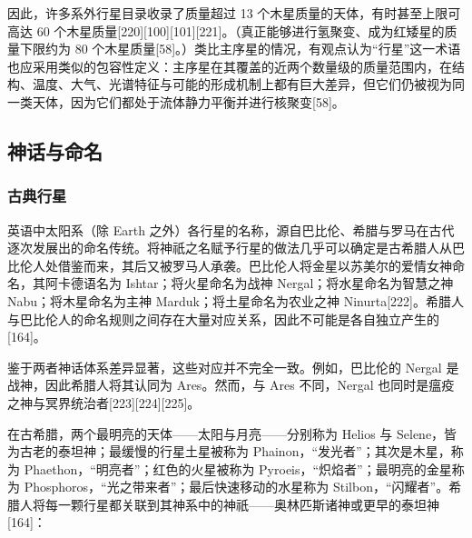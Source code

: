因此，许多系外行星目录收录了质量超过 13 个木星质量的天体，有时甚至上限可高达 60 个木星质量[220][100][101][221]。（真正能够进行氢聚变、成为红矮星的质量下限约为 80 个木星质量[58]。）类比主序星的情况，有观点认为“行星”这一术语也应采用类似的包容性定义：主序星在其覆盖的近两个数量级的质量范围内，在结构、温度、大气、光谱特征与可能的形成机制上都有巨大差异，但它们仍被视为同一类天体，因为它们都处于流体静力平衡并进行核聚变[58]。
\subsection{神话与命名}
\subsubsection{古典行星}
英语中太阳系（除 Earth 之外）各行星的名称，源自巴比伦、希腊与罗马在古代逐次发展出的命名传统。将神祇之名赋予行星的做法几乎可以确定是古希腊人从巴比伦人处借鉴而来，其后又被罗马人承袭。巴比伦人将金星以苏美尔的爱情女神命名，其阿卡德语名为 Ishtar；将火星命名为战神 Nergal；将水星命名为智慧之神 Nabu；将木星命名为主神 Marduk；将土星命名为农业之神 Ninurta[222]。希腊人与巴比伦人的命名规则之间存在大量对应关系，因此不可能是各自独立产生的[164]。

鉴于两者神话体系差异显著，这些对应并不完全一致。例如，巴比伦的 Nergal 是战神，因此希腊人将其认同为 Ares。然而，与 Ares 不同，Nergal 也同时是瘟疫之神与冥界统治者[223][224][225]。

在古希腊，两个最明亮的天体——太阳与月亮——分别称为 Helios 与 Selene，皆为古老的泰坦神；最缓慢的行星土星被称为 Phainon，“发光者”；其次是木星，称为 Phaethon，“明亮者”；红色的火星被称为 Pyroeis，“炽焰者”；最明亮的金星称为 Phosphoros，“光之带来者”；最后快速移动的水星称为 Stilbon，“闪耀者”。希腊人将每一颗行星都关联到其神系中的神祇——奥林匹斯诸神或更早的泰坦神[164]：

